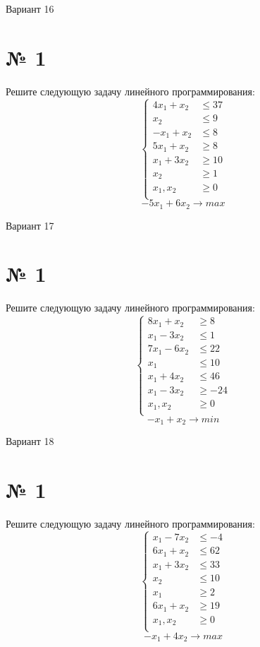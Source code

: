 \documentclass{article}%
\begin{document}
%
\newpage%
\begin{center}%
\begin{Huge}%
Вариант 16%
\end{Huge}%
\end{center}%
\section*{№ 1}%
\label{sec:1}%
Решите следующую задачу линейного программирования: %
\[%
\left\{\begin{aligned}4x_{1}+x_{2} & \le37 \\x_{2} & \le9 \\-x_{1}+x_{2} & \le8 \\5x_{1}+x_{2} & \ge8 \\x_{1}+3x_{2} & \ge10 \\x_{2} & \ge1 \\x_{1},x_{2} & \ge 0 \\\end{aligned}\right.%
\]%
\[%
-5x_{1}+6x_{2}  \to max%
\]

%
\newpage%
\begin{center}%
\begin{Huge}%
Вариант 17%
\end{Huge}%
\end{center}%
\section*{№ 1}%
\label{sec:1}%
Решите следующую задачу линейного программирования: %
\[%
\left\{\begin{aligned}8x_{1}+x_{2} & \ge8 \\x_{1}-3x_{2} & \le1 \\7x_{1}-6x_{2} & \le22 \\x_{1} & \le10 \\x_{1}+4x_{2} & \le46 \\x_{1}-3x_{2} & \ge-24 \\x_{1},x_{2} & \ge 0 \\\end{aligned}\right.%
\]%
\[%
-x_{1}+x_{2}  \to min%
\]

%
\newpage%
\begin{center}%
\begin{Huge}%
Вариант 18%
\end{Huge}%
\end{center}%
\section*{№ 1}%
\label{sec:1}%
Решите следующую задачу линейного программирования: %
\[%
\left\{\begin{aligned}x_{1}-7x_{2} & \le-4 \\6x_{1}+x_{2} & \le62 \\x_{1}+3x_{2} & \le33 \\x_{2} & \le10 \\x_{1} & \ge2 \\6x_{1}+x_{2} & \ge19 \\x_{1},x_{2} & \ge 0 \\\end{aligned}\right.%
\]%
\[%
-x_{1}+4x_{2}  \to max%
\]
\end{document}
